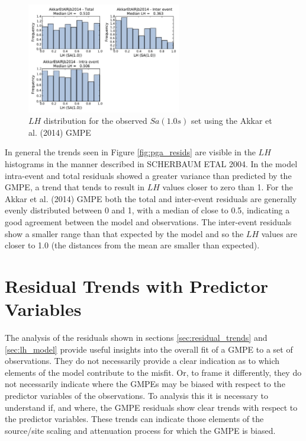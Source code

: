 \begin{figure}[htb]
	\centering
		\includegraphics[width=0.6\textwidth]{./figures/residuals/Akkar2014_LH_Sa1.pdf}
	\caption{$LH$ distribution for the observed $Sa \left( {1.0 s} \right)$ set using the Akkar et al. (2014) GMPE}
	\label{fig:sa1_lh_akkar2014}
\end{figure}

In general the trends seen in Figure \ref{fig:pga_resids} are visible in the $LH$ histograms in the manner described in SCHERBAUM ETAL 2004. In the \cite{boore2008} model intra-event and total residuals showed a greater variance than predicted by the GMPE, a trend that tends to result in $LH$ values closer to zero than 1. For the Akkar et al. (2014) GMPE both the total and inter-event residuals are generally evenly distributed between 0 and 1, with a median of close to 0.5, indicating a good agreement between the model and observations. The inter-event residuals show a smaller range than that expected by the model and so the $LH$ values are closer to 1.0 (the distances from the mean are smaller than expected). 

\section{Residual Trends with Predictor Variables}
\label{sec:predictor_trends}

The analysis of the residuals shown in sections \ref{sec:residual_trends} and \ref{sec:lh_model} provide useful insights into the overall fit of a GMPE to a set of observations. They do not necessarily provide a clear indication as to which elements of the model contribute to the misfit. Or, to frame it differently, they do not necessarily indicate where the GMPEs may be biased with respect to the predictor variables of the observations. To analysis this it is necessary to understand if, and where, the GMPE residuals show clear trends with respect to the predictor variables. These trends can indicate those elements of the source/site scaling and attenuation process for which the GMPE is biased.

